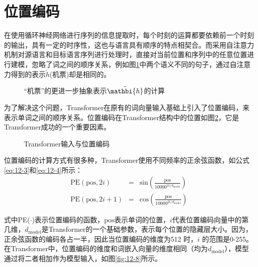 
\section{位置编码}

\parinterval 在使用循环神经网络进行序列的信息提取时，每个时刻的运算都要依赖前一个时刻的输出，具有一定的时序性，这也与语言具有顺序的特点相契合。而采用自注意力机制对源语言和目标语言序列进行处理时，直接对当前位置和序列中的任意位置进行建模，忽略了词之间的顺序关系，例如图\ref{fig:12-6}中两个语义不同的句子，通过自注意力得到的表示$\tilde{h}$(机票)却是相同的。

\begin{figure}[htp]
\centering

\caption{“机票”的更进一步抽象表示$\tilde{\mathbi{h}}$的计算}
\label{fig:12-6}
\end{figure}

\parinterval 为了解决这个问题，Transformer在原有的词向量输入基础上引入了位置编码，来表示单词之间的顺序关系。位置编码在Transformer结构中的位置如图\ref{fig:12-7}，它是Transformer成功的一个重要因素。

\begin{figure}[htp]
\centering

\caption{Transformer输入与位置编码}
\label{fig:12-7}
\end{figure}

\parinterval 位置编码的计算方式有很多种，Transformer使用不同频率的正余弦函数，如公式\eqref{eq:12-3}和\eqref{eq:12-4}所示：
\begin{eqnarray}
\textrm{PE}(\textrm{pos},2i) & = & \textrm{sin} (\frac{\textrm{pos}}{10000^{2i/d_{\textrm{model}}}}) \label{eq:12-3} \\
\textrm{PE}(\textrm{pos},2i+1) & = & \textrm{cos} (\frac{\textrm{pos}}{10000^{2i/d_{\textrm{model}}}}) \label{eq:12-4}
\end{eqnarray}

\noindent 式中PE($\cdot$)表示位置编码的函数，$\textrm{pos}$表示单词的位置，$i$代表位置编码向量中的第几维，$d_{\textrm{model}}$是Transformer的一个基础参数，表示每个位置的隐藏层大小。因为，正余弦函数的编码各占一半，因此当位置编码的维度为512 时，$i$ 的范围是0-255。 在Transformer中，位置编码的维度和词嵌入向量的维度相同（均为$d_{\textrm{model}}$），模型通过将二者相加作为模型输入，如图\ref{fig:12-8}所示。

